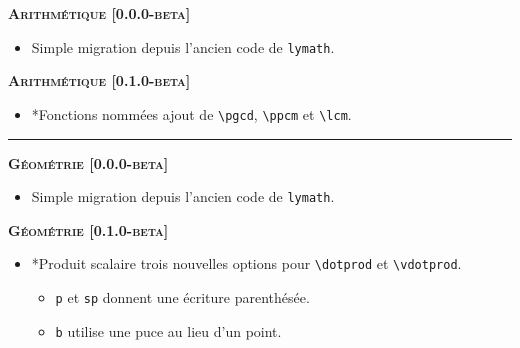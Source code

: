 \documentclass[12pt,a4paper]{book}
\makeatletter
\newcommand\env[1]{\texttt{#1}}
\newcommand\macro[1]{\env{\textbackslash{}#1}}
\theoremstyle{definition}
\newcommand\separation{
	\medskip
	\hfill\rule{0.5\textwidth}{0.75pt}\hfill
	\medskip
}
\newcommand\topic{\@ifstar{\@topic@star}{\@topic@no@star}}
\newcommand\@topic@no@star[1]{%
	\textbf{\textsc{#1}.}%
}
\newcommand\@topic@star[1]{%
	\textbf{\textsc{#1} :}%
}
\makeatother
\begin{document}
{{\begin{description}
    
    \begin{center}
        \textbf{\textsc{Arithmétique [0.0.0-beta]}}
    \end{center}
    
    \begin{itemize}[itemsep=.5em]
        \item Simple migration depuis l'ancien code de \verb+lymath+.
    \end{itemize}
    
    
    \begin{center}
        \textbf{\textsc{Arithmétique [0.1.0-beta]}}
    \end{center}
    
    \begin{itemize}[itemsep=.5em]
        \item \topic*{Fonctions nommées} ajout de \macro{pgcd}, \macro{ppcm} et \macro{lcm}.
    \end{itemize}
    
    
    \separation
    
    
    
    
    \begin{center}
        \textbf{\textsc{Géométrie [0.0.0-beta]}}
    \end{center}
    
    \begin{itemize}[itemsep=.5em]
        \item Simple migration depuis l'ancien code de \verb+lymath+.
    \end{itemize}
    
    
    \begin{center}
        \textbf{\textsc{Géométrie [0.1.0-beta]}}
    \end{center}
    
    \begin{itemize}[itemsep=.5em]
        \item \topic*{Produit scalaire}
              trois nouvelles options pour \macro{dotprod} et \macro{vdotprod}.
        \begin{itemize}[itemsep=.5em]
            \item \verb+p+ et \verb+sp+ donnent une écriture parenthésée.
    
            \item \verb+b+ utilise une puce au lieu d'un point.
        \end{itemize}
    

\end{itemize}
\end{description}}}
\end{document}
